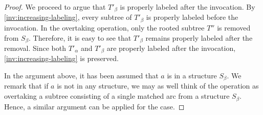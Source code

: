 \documentclass{article}
\newcommand{\alp}{\alpha}
\begin{document}
\begin{proof}
We proceed to argue that $T'_\beta$ is properly labeled after the invocation.
By \cref{inv:increasing-labeling}, every subtree of $T'_\beta$ is properly labeled before the invocation.
In the overtaking operation, only the rooted subtree $T''$ is removed from $S_\beta$.
Therefore, it is easy to see that $T'_\beta$ remains properly labeled after the removal.
Since both $T'_\alp$ and $T'_\beta$ are properly labeled after the invocation, \cref{inv:increasing-labeling} is preserved.

In the argument above, it has been assumed that $a$ is in a structure $S_\beta$.
We remark that if $a$ is not in any structure, we may as well think of the operation as overtaking a subtree consisting of a single matched arc from a structure $S_\beta$.
Hence, a similar argument can be applied for the case.
\end{proof}
\end{document}
